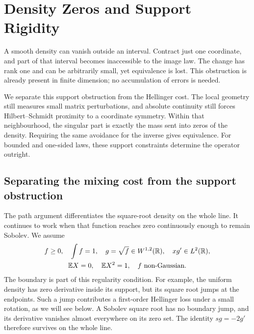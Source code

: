 \section{Density Zeros and Support Rigidity}

A smooth density can vanish outside an interval. Contract just one
coordinate, and part of that interval becomes inaccessible to the image
law. The change has rank one and can be arbitrarily small, yet equivalence
is lost. This obstruction is already present in finite dimension; no
accumulation of errors is needed.

We separate this support obstruction from the Hellinger cost. The local
geometry still measures small matrix perturbations, and absolute continuity
still forces Hilbert--Schmidt proximity to a coordinate symmetry. Within
that neighbourhood, the singular part is exactly the mass sent into zeros
of the density. Requiring the same avoidance for the inverse gives
equivalence. For bounded and one-sided laws, these support constraints
determine the operator outright.

\subsection{Separating the mixing cost from the support obstruction}

The path argument differentiates the square-root density on the whole
line. It continues to work when that function reaches zero continuously
enough to remain Sobolev. We assume
\begin{equation}
 \begin{gathered}
 f\geq0,\quad \int f=1,\quad
 g=\sqrt f\in W^{1,2}(\mathbb R),\quad xg'\in L^2(\mathbb R),\\
 \mathbb E X=0,\quad \mathbb E X^2=1,\quad f\text{ non-Gaussian}.
 \end{gathered}
 \label{eq:zero-set-row-assumptions}
\end{equation}
The boundary is part of this regularity condition. For example, the uniform
density has zero derivative inside its support, but its square root jumps
at the endpoints. Such a jump contributes a first-order Hellinger loss
under a small rotation, as we will see below. A Sobolev square root has no
boundary jump, and its derivative vanishes almost everywhere on its zero
set. The identity \(sg=-2g'\) therefore survives on the whole line.

